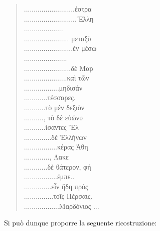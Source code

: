 \begin{multicols}{2}
\begin{quotation}
{{    \lbrk.......................... ἐστρα\\
    \lbrk........................... Ἕλλη\\
    \lbrk....................\\
    \lbrk....................... μεταξὺ \\
    \lbrk.........................\rbrk ἐν μέσω\\
    \lbrk......................\\
    \lbrk........................ δὲ Μαρ\\
    \lbrk...................... καὶ τῶν\\
    \lbrk.................. μηδισάν\\
    \lbrk............ τέσσαρες. \\
    \lbrk...........\rbrk τὸ μὲν δεξιὸν \\
    \lbrk.........., τὸ δὲ εὐώνυ\\
    \lbrk...........ίσαντες Ἕλ\\
    \lbrk.............. δὲ Ἑλλήνων \\
    \lbrk................. κέρας Ἀθη\\
    \lbrk............., Λακε\\
    \lbrk............ δὲ θάτερον, φή\\
    \lbrk................. ἐμπε\lbrk..\rbrk\\
    \lbrk..............\rbrk εἶν ἤδη πρὸς\\
    \lbrk............... τοῖς Πέρσαις.\\
    ..................\rbrk Μαρδόνιος \lbrk...\rbrk 
    }
    }
    \end{quotation}
    \end{multicols}
    
    \clearpage
    Si può dunque proporre la seguente ricostruzione:
    
